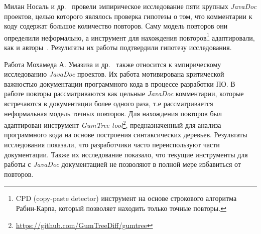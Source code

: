 Милан Носаль и др.~\cite{poruban2016preliminary} провели эмпирическое исследование пяти крупных  
\emph{JavaDoc} проектов, целью которого являлось проверка гипотезы о том, что комментарии к коду содержат большое количество повторов.
Саму модель повторов они определили неформально, а инструмент для нахождения повторов\footnote{CPD (copy-paste detector) инструмент на основе строкового алгоритма Рабин-Карпа, который позволяет находить только точные повторы.} адаптировали, как и авторы~\cite{juergens2010can}.
Результаты их работы подтвердили гипотезу исследования. 


Работа Мохамеда А. Умазиза и др.~\cite{oumaziz2017documentation} также относится к эмпирическому исследованию \emph{JavaDoc} проектов. 
Их работа мотивирована критической важностью документации программного кода в процессе разработки ПО.
В работе повторы рассматриваются как цельные \emph{JavaDoc} комментарии, которые встречаются в документации более одного раза, т.е рассматривается неформальная модель точных повторов.
Для нахождения повторов был адаптирован инструмент \emph{GumTree tool}\footnote{\url{https://github.com/GumTreeDiff/gumtree}},  предназначенный для анализа программного кода на основе построения синтаксических деревьев.
Результаты исследования показали, что  разработчики часто  переиспользуют части документации.
Также их исследование показало, что текущие инструменты для работы с \emph{JavaDoc} документацией не позволяют в полной мере избавиться от повторов.



